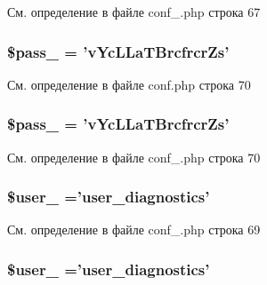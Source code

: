 См. определение в файле conf\-\_\-.\-php строка 67

\hypertarget{group___d_b__1_ga41dc8c99445163effebda89820668a55}{
\subsubsection[{\$pass\-\_\-1}]{\setlength{\rightskip}{0pt plus 5cm}\$pass\-\_ = 'v\-Yc\-L\-La\-T\-Brcfrcr\-Zs'}}\label{group___d_b__1_ga41dc8c99445163effebda89820668a55}


См. определение в файле conf.\-php строка 70

\hypertarget{group___d_b__1_ga41dc8c99445163effebda89820668a55}{
\subsubsection[{\$pass\-\_\-1}]{\setlength{\rightskip}{0pt plus 5cm}\$pass\-\_ = 'v\-Yc\-L\-La\-T\-Brcfrcr\-Zs'}}\label{group___d_b__1_ga41dc8c99445163effebda89820668a55}


См. определение в файле conf\-\_\-.\-php строка 70

\hypertarget{group___d_b__1_gaa3ccf4fb708509a71be03fc744a99d58}{
\subsubsection[{\$user\-\_\-1}]{\setlength{\rightskip}{0pt plus 5cm}\$user\-\_ ='user\-\_\-diagnostics'}}\label{group___d_b__1_gaa3ccf4fb708509a71be03fc744a99d58}


См. определение в файле conf\-\_\-.\-php строка 69

\hypertarget{group___d_b__1_gaa3ccf4fb708509a71be03fc744a99d58}{
\subsubsection[{\$user\-\_\-1}]{\setlength{\rightskip}{0pt plus 5cm}\$user\-\_ ='user\-\_\-diagnostics'}}\label{group___d_b__1_gaa3ccf4fb708509a71be03fc744a99d58}


